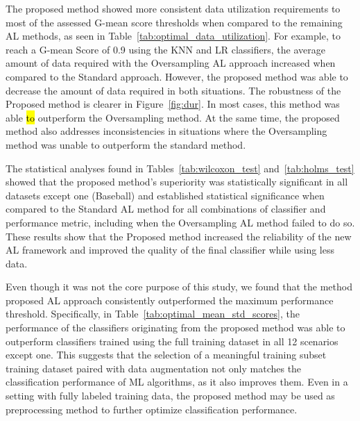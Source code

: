 \documentclass[preprint, 12pt]{elsarticle}
\begin{document}
The proposed method showed more consistent data utilization requirements to
most of the assessed G-mean score thresholds when compared to the remaining AL
methods, as seen in Table~\ref{tab:optimal_data_utilization}. For example, to
reach a G-mean Score of 0.9 using the KNN and LR classifiers, the average
amount of data required with the Oversampling AL approach increased when
compared to the Standard approach. However, the proposed method was able to
decrease the amount of data required in both situations. The robustness of the
Proposed method is clearer in Figure~\ref{fig:dur}. In most cases, this method
was able \hl{to} outperform the Oversampling method. At the same time, the
proposed method also addresses inconsistencies in situations where the
Oversampling method was unable to outperform the standard method.

The statistical analyses found in Tables~\ref{tab:wilcoxon_test}
and~\ref{tab:holms_test} showed that the proposed method's superiority was
statistically significant in all datasets except one (Baseball) and
established statistical significance when compared to the Standard AL method
for all combinations of classifier and performance metric, including when the
Oversampling AL method failed to do so. These results show that the Proposed
method increased the reliability of the new AL framework and improved the
quality of the final classifier while using less data.

Even though it was not the core purpose of this study, we found that the
method proposed AL approach consistently outperformed the maximum performance
threshold. Specifically, in Table~\ref{tab:optimal_mean_std_scores}, the
performance of the classifiers originating from the proposed method was able
to outperform classifiers trained using the full training dataset in all 12
scenarios except one. This suggests that the selection of a meaningful
training subset training dataset paired with data augmentation not only
matches the classification performance of ML algorithms, as it also improves
them. Even in a setting with fully labeled training data, the proposed method
may be used as preprocessing method to further optimize classification
performance.
\end{document}
